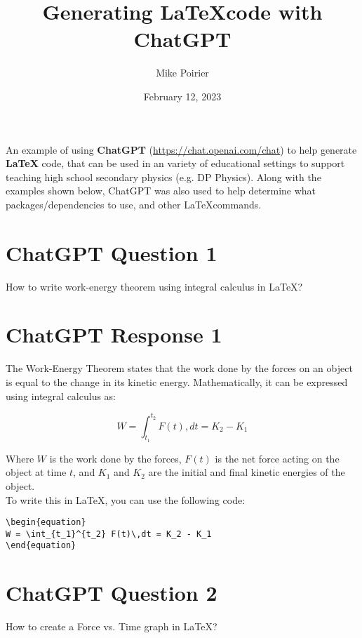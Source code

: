 \documentclass{article}
\title{\textbf{Generating \LaTeX \space code  with ChatGPT}}
\author{Mike Poirier}
\date{February 12, 2023}
\begin{document}
\maketitle

An example of using \textbf{ChatGPT} (\url{https://chat.openai.com/chat}) to help generate \textbf{\LaTeX} code, that can be used in an variety of educational settings to support teaching high school secondary physics (e.g. DP Physics). Along with the examples shown below, ChatGPT was also used to help determine what packages/dependencies to use, and other \LaTeX \space commands.

\section{ChatGPT Question 1}
\noindent %
    How to write work-energy theorem using integral calculus in LaTeX?

\section{ChatGPT Response 1}
\noindent
The Work-Energy Theorem states that the work done by the forces on an object is equal to the change in its kinetic energy. Mathematically, it can be expressed using integral calculus as:

$$W = \int_{t_1}^{t_2} F(t),dt = K_2 - K_1$$

Where $W$ is the work done by the forces, $F(t)$ is the net force acting on the object at time $t$, and $K_1$ and $K_2$ are the initial and final kinetic energies of the object.
\\

To write this in \LaTeX, you can use the following code:

\begin{tcolorbox} %
\begin{verbatim}
\begin{equation}
W = \int_{t_1}^{t_2} F(t)\,dt = K_2 - K_1
\end{equation}
\end{verbatim}
\end{tcolorbox}

\newpage

\section{ChatGPT Question 2}
\noindent
How to create a Force vs. Time graph in LaTeX?
\end{document}
